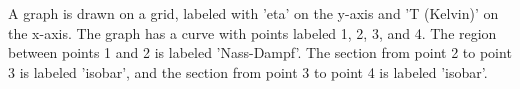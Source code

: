A graph is drawn on a grid, labeled with 'eta' on the y-axis and 'T (Kelvin)' on the x-axis. The graph has a curve with points labeled 1, 2, 3, and 4. The region between points 1 and 2 is labeled 'Nass-Dampf'. The section from point 2 to point 3 is labeled 'isobar', and the section from point 3 to point 4 is labeled 'isobar'.